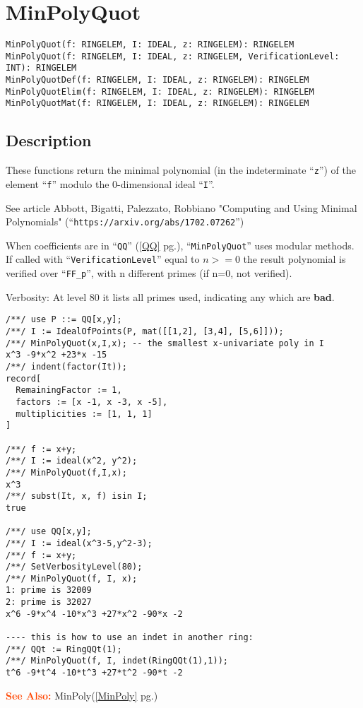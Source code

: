 \documentclass[a4paper]{mybook}
\newenvironment{command}{}{} %
\newcommand\SeeAlso{\par\textcolor{OrangeRed}{\textbf{\large See Also: }}}
\begin{document}
\section{MinPolyQuot}
\label{MinPolyQuot}
\begin{command} %


\begin{Verbatim}[label=syntax, rulecolor=\color{MidnightBlue},
frame=single]
MinPolyQuot(f: RINGELEM, I: IDEAL, z: RINGELEM): RINGELEM
MinPolyQuot(f: RINGELEM, I: IDEAL, z: RINGELEM, VerificationLevel: INT): RINGELEM
MinPolyQuotDef(f: RINGELEM, I: IDEAL, z: RINGELEM): RINGELEM
MinPolyQuotElim(f: RINGELEM, I: IDEAL, z: RINGELEM): RINGELEM
MinPolyQuotMat(f: RINGELEM, I: IDEAL, z: RINGELEM): RINGELEM
\end{Verbatim}


\subsection*{Description}

These functions return the minimal polynomial (in the indeterminate ``\verb&z&'')
of the element ``\verb&f&'' modulo the 0-dimensional ideal ``\verb&I&''.
\par 
See article Abbott, Bigatti, Palezzato, Robbiano
"Computing and Using Minimal Polynomials"
(``\verb&https://arxiv.org/abs/1702.07262&'')
\par 
When coefficients are in ``\verb&QQ&'' (\ref{QQ} pg.\pageref{QQ}), ``\verb&MinPolyQuot&'' uses modular methods.
If called with ``\verb&VerificationLevel&'' equal to $n>=0$ the result polynomial
is verified over ``\verb&FF_p&'', with n different primes (if n=0, not verified).
\par 
Verbosity:
At level 80 it lists all primes used, indicating any which are \textbf{bad}.
\begin{Verbatim}[label=example, rulecolor=\color{PineGreen}, frame=single]
/**/ use P ::= QQ[x,y];
/**/ I := IdealOfPoints(P, mat([[1,2], [3,4], [5,6]]));
/**/ MinPolyQuot(x,I,x); -- the smallest x-univariate poly in I
x^3 -9*x^2 +23*x -15
/**/ indent(factor(It));
record[
  RemainingFactor := 1,
  factors := [x -1, x -3, x -5],
  multiplicities := [1, 1, 1]
]

/**/ f := x+y;
/**/ I := ideal(x^2, y^2);
/**/ MinPolyQuot(f,I,x);
x^3
/**/ subst(It, x, f) isin I;
true

/**/ use QQ[x,y];
/**/ I := ideal(x^3-5,y^2-3);
/**/ f := x+y;
/**/ SetVerbosityLevel(80);
/**/ MinPolyQuot(f, I, x);
1: prime is 32009
2: prime is 32027
x^6 -9*x^4 -10*x^3 +27*x^2 -90*x -2

---- this is how to use an indet in another ring:
/**/ QQt := RingQQt(1);
/**/ MinPolyQuot(f, I, indet(RingQQt(1),1));
t^6 -9*t^4 -10*t^3 +27*t^2 -90*t -2
\end{Verbatim}


\SeeAlso %
  MinPoly(\ref{MinPoly} pg.\pageref{MinPoly})
\end{command} %
\end{document}
